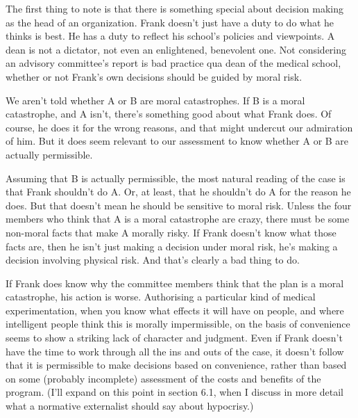 The first thing to note is that there is something special about decision making as the head of an organization. \gls{Frank} doesn't just have a duty to do what he thinks is best. He has a duty to reflect his school's policies and viewpoints. A dean is not a dictator, not even an enlightened, benevolent one. Not considering an advisory committee's report is bad practice qua dean of the medical school, whether or not \gls{Frank}'s own decisions should be guided by moral risk.

We aren't told whether A or B are moral catastrophes. If B is a moral catastrophe, and A isn't, there's something good about what \gls{Frank} does. Of course, he does it for the wrong reasons, and that might undercut our admiration of him. But it does seem relevant to our assessment to know whether A or B are actually permissible.

Assuming that B is actually permissible, the most natural reading of the case is that \gls{Frank} shouldn't do A. Or, at least, that he shouldn't do A for the reason he does. But that doesn't mean he should be sensitive to moral risk. Unless the four members who think that A is a moral catastrophe are crazy, there must be some non-moral facts that make A morally risky. If \gls{Frank} doesn't know what those facts are, then he isn't just making a decision under moral risk, he's making a decision involving physical risk. And that's clearly a bad thing to do.

If \gls{Frank} does know why the committee members think that the plan is a moral catastrophe, his action is worse. Authorising a particular kind of medical experimentation, when you know what effects it will have on people, and where intelligent people think this is morally impermissible, on the basis of convenience seems to show a striking lack of character and judgment. Even if \gls{Frank} doesn't have the time to work through all the ins and outs of the case, it doesn't follow that it is permissible to make decisions based on convenience, rather than based on some (probably incomplete) assessment of the costs and benefits of the program. (I'll expand on this point in section 6.1, when I discuss in more detail what a normative externalist should say about hypocrisy.)

